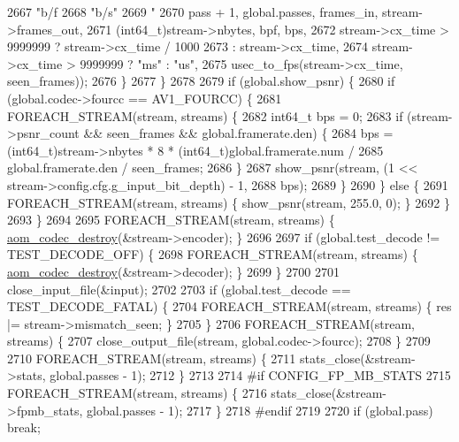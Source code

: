 \begin{DoxyCodeInclude}
{{{{{{{{{{{{{{{{{{{{{{{{{{{{{{{{{{{{{{{{{{{{{{{{{{{{{{{{{{{{{{{{{{{{{{{{{{2667             \textcolor{stringliteral}{"b/f %
2668             \textcolor{stringliteral}{"b/s"}
2669             \textcolor{stringliteral}{" %
2670             pass + 1, global.passes, frames\_in, stream->frames\_out,
2671             (int64\_t)stream->nbytes, bpf, bps,
2672             stream->cx\_time > 9999999 ? stream->cx\_time / 1000
2673                 : stream->cx\_time,
2674                   stream->cx\_time > 9999999 ? \textcolor{stringliteral}{"ms"} : \textcolor{stringliteral}{"us"},
2675                       usec\_to\_fps(stream->cx\_time, seen\_frames));
2676       \}
2677     \}
2678 
2679     \textcolor{keywordflow}{if} (global.show\_psnr) \{
2680       \textcolor{keywordflow}{if} (global.codec->fourcc == AV1\_FOURCC) \{
2681         FOREACH\_STREAM(stream, streams) \{
2682           int64\_t bps = 0;
2683           \textcolor{keywordflow}{if} (stream->psnr\_count && seen\_frames && global.framerate.den) \{
2684             bps = (int64\_t)stream->nbytes * 8 * (int64\_t)global.framerate.num /
2685                 global.framerate.den / seen\_frames;
2686           \}
2687           show\_psnr(stream, (1 << stream->config.cfg.g\_input\_bit\_depth) - 1,
2688               bps);
2689         \}
2690       \} \textcolor{keywordflow}{else} \{
2691         FOREACH\_STREAM(stream, streams) \{ show\_psnr(stream, 255.0, 0); \}
2692       \}
2693     \}
2694 
2695     FOREACH\_STREAM(stream, streams) \{ \hyperlink{group__codec_ga9b60e186f61ba2d6ab2b8069b76a15c5}{aom\_codec\_destroy}(&stream->encoder); \}
2696 
2697     \textcolor{keywordflow}{if} (global.test\_decode != TEST\_DECODE\_OFF) \{
2698       FOREACH\_STREAM(stream, streams) \{ \hyperlink{group__codec_ga9b60e186f61ba2d6ab2b8069b76a15c5}{aom\_codec\_destroy}(&stream->decoder); \}
2699     \}
2700 
2701     close\_input\_file(&input);
2702 
2703     \textcolor{keywordflow}{if} (global.test\_decode == TEST\_DECODE\_FATAL) \{
2704       FOREACH\_STREAM(stream, streams) \{ res |= stream->mismatch\_seen; \}
2705     \}
2706     FOREACH\_STREAM(stream, streams) \{
2707       close\_output\_file(stream, global.codec->fourcc);
2708     \}
2709 
2710     FOREACH\_STREAM(stream, streams) \{
2711       stats\_close(&stream->stats, global.passes - 1);
2712     \}
2713 
2714 \textcolor{preprocessor}{#if CONFIG\_FP\_MB\_STATS}
2715     FOREACH\_STREAM(stream, streams) \{
2716       stats\_close(&stream->fpmb\_stats, global.passes - 1);
2717     \}
2718 \textcolor{preprocessor}{#endif}
2719 
2720     \textcolor{keywordflow}{if} (global.pass) \textcolor{keywordflow}{break};
}}}}}}}}}}}}}}}}}}}}}}}}}}}}}}}}}}}}}}}}}}}}}}}}}}}}}}}}}}}}}}}}}}}}}}}}}}}}
\end{DoxyCodeInclude}
